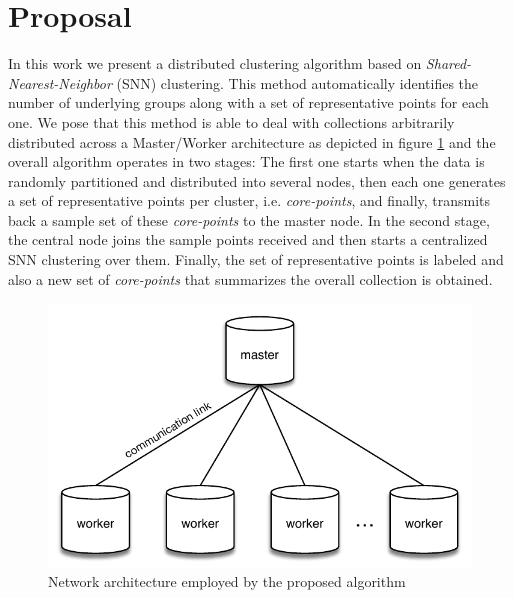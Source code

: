 \documentclass[a4paper]{article}
\begin{document}
\section{Proposal}
In this work we present a distributed clustering algorithm based on \textit{Shared-Nearest-Neighbor} (SNN) clustering. This method automatically identifies the number of  underlying groups along with a set of representative points for each one.
We pose that this method is able to deal with collections arbitrarily distributed across a Master/Worker architecture as depicted in figure \ref{fig:distributed_architecture} and the overall algorithm operates in two stages: The first one starts when the data is randomly partitioned and distributed into several nodes, then each one generates a set of representative points per cluster, i.e. \textit{core-points}, and finally, transmits back a sample set of these \textit{core-points} to the master node. In the second stage, the central node joins the sample points received and then starts a centralized SNN clustering over them. Finally, the set of representative points is labeled and also a new set of \textit{core-points} that summarizes the overall collection is obtained.  

\begin{figure}[!htbp]
\centering
  \includegraphics[scale=0.8]{distributed_architecture.pdf}
  \caption{Network architecture employed by the proposed algorithm}
  \label{fig:distributed_architecture}
\end{figure}
\end{document}
